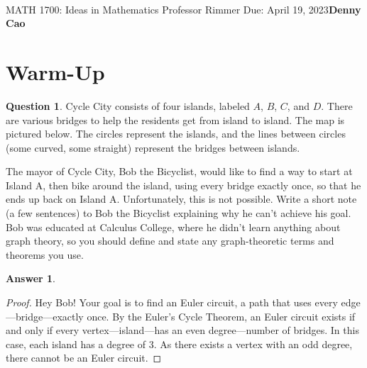 \documentclass[article, 12pt]{article}
\title{\Large\bf{\psetName}}
\makeatletter
\theoremstyle{definition}
\newcommand{\courseNumber}{MATH 1700}
\newcommand{\courseName}{Ideas in Mathematics}
\newcommand{\professor}{Professor Rimmer}
\newcommand{\dueDate}{Due: April 19, 2023}
\newcommand{\name}{Denny Cao}
\newtheorem{question}{Question}
\newtheorem{answer}{Answer}
\renewcommand{\maketitle}{\bgroup\setlength{\parindent}{0pt}
    \begin{flushleft}
        \textbf{\@title} \\ \vskip0.2cm
        \begingroup
            \fontsize{14pt}{12pt}\selectfont
            \courseNumber: \courseName 
            \vskip0.3cm 
            \professor
        \endgroup \vskip0.3cm
        \dueDate \hfill\rlap{}\bf{\name} \\ \vskip0.1cm
        \hrulefill
    \end{flushleft}\egroup 
}
\makeatother
\begin{document}
    \maketitle
    \thispagestyle{plain}
    \section{Warm-Up}
    \begin{question}
        Cycle City consists of four islands, labeled $A$, $B$, $C$, and $D$. There are various bridges to help the residents get from island to island. The map is pictured below. The circles represent the islands, and the lines between circles (some curved, some straight) represent the bridges between islands.
        \begin{figure}[H]
            \centering
        \end{figure}
        The mayor of Cycle City, Bob the Bicyclist, would like to find a way to start at Island
        A, then bike around the island, using every bridge exactly once, so that he ends up back on Island A. Unfortunately, this is not possible. Write a short note (a few sentences) to Bob the Bicyclist explaining why he can't achieve his goal. Bob was educated at Calculus College, where he didn't learn anything about graph theory, so you should define and state any graph-theoretic terms and theorems you use.
    \end{question}
    \begin{answer}
        \begin{proof}
            Hey Bob! Your goal is to find an Euler circuit, a path that uses every edge---bridge---exactly once. By the Euler's Cycle Theorem, an Euler circuit exists if and only if every vertex---island---has an even degree---number of bridges. In this case, each island has a degree of 3. As there exists a vertex with an odd degree, there cannot be an Euler circuit.
        \end{proof}
    \end{answer}
\end{document}
